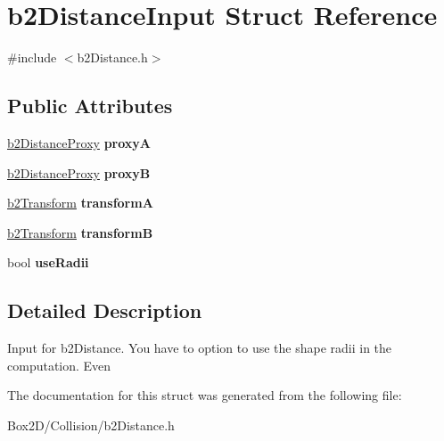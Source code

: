 \hypertarget{structb2_distance_input}{}\section{b2\+Distance\+Input Struct Reference}
\label{structb2_distance_input}


{\ttfamily \#include $<$b2\+Distance.\+h$>$}

\subsection*{Public Attributes}
\begin{DoxyCompactItemize}
\item 
\mbox{\label{structb2_distance_input_a84d378f4f0e2f06fbe03d413e9dfbbd9}} 
\hyperlink{structb2_distance_proxy}{b2\+Distance\+Proxy} {\bfseries proxyA}
\item 
\mbox{\label{structb2_distance_input_ad08521a9cdf9d418ececfd44de83a5d3}} 
\hyperlink{structb2_distance_proxy}{b2\+Distance\+Proxy} {\bfseries proxyB}
\item 
\mbox{\label{structb2_distance_input_a0889c2f7120ba521d6e40e2a22834ddb}} 
\hyperlink{structb2_transform}{b2\+Transform} {\bfseries transformA}
\item 
\mbox{\label{structb2_distance_input_a47352d7c5b3db80b2fb8cf338f1c1895}} 
\hyperlink{structb2_transform}{b2\+Transform} {\bfseries transformB}
\item 
\mbox{\label{structb2_distance_input_ab72a770be4a91997d00112409de5fea7}} 
bool {\bfseries use\+Radii}
\end{DoxyCompactItemize}


\subsection{Detailed Description}
Input for b2\+Distance. You have to option to use the shape radii in the computation. Even 

The documentation for this struct was generated from the following file\+:\begin{DoxyCompactItemize}
\item 
Box2\+D/\+Collision/b2\+Distance.\+h\end{DoxyCompactItemize}
